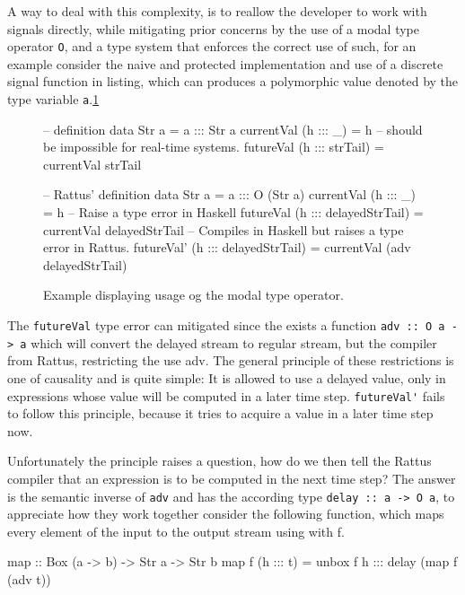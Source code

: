 \par A way to deal with this complexity, is to reallow the developer to work with signals directly, while mitigating prior concerns by the use of a modal type operator \verb|O|, and a type system that enforces the correct use of such, for an example consider the naive and protected implementation and use of a discrete signal function in listing, which can produces a polymorphic value denoted by the type variable \verb|a|.\ref{lst:modalExample}
\begin{figure}
    \centering
    \begin{hscode}
      -- definition
      data Str a = a ::: Str a
      currentVal (h ::: _) = h
      -- should be impossible for real-time systems.
      futureVal (h ::: strTail) = currentVal strTail  
      
      -- Rattus' definition
      data Str a = a ::: O (Str a)
      currentVal (h ::: _) = h
      -- Raise a type error in Haskell
      futureVal (h ::: delayedStrTail) = currentVal delayedStrTail  
      -- Compiles in Haskell but raises a type error in Rattus.
      futureVal' (h ::: delayedStrTail) = currentVal (adv delayedStrTail)  
      
    \end{hscode}
    \caption{Example displaying usage og the modal type operator.}
    \label{lst:modalExample}
\end{figure}
The \verb|futureVal| type error can mitigated since the exists a function \verb|adv :: O a -> a| which will convert the delayed stream to regular stream, but the compiler from Rattus, restricting the use adv. The general principle of these restrictions\parencite{KrishanType} is one of causality and is quite simple: It is allowed to use a delayed value, only in expressions whose value will be computed in a later time step.
\verb|futureVal'| fails to follow this principle, because it tries to acquire a value in a later time step now. 
\par Unfortunately the principle raises a question, how do we then tell the Rattus compiler that an expression is to be computed in the next time step? The answer is the semantic inverse of \verb|adv| and has the according type \verb|delay :: a -> O a|, to appreciate how they work together consider the following function, which maps every element of the input to the output stream using with f.
\begin{hscode}
    map :: Box (a -> b) -> Str a -> Str b 
    map f (h ::: t) = unbox f h ::: delay (map f (adv t)) 
\end{hscode}
